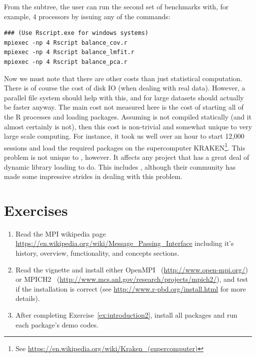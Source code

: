 From the  subtree, the user can run the second set of
benchmarks with, for example, 4 processors by issuing any of the commands:
\begin{lstlisting}
### (Use Rscript.exe for windows systems)
mpiexec -np 4 Rscript balance_cov.r
mpiexec -np 4 Rscript balance_lmfit.r
mpiexec -np 4 Rscript balance_pca.r
\end{lstlisting}

Now we must note that there are other costs than just statistical
computation. There is of course the cost of disk IO (when dealing with real
data). However, a parallel file system should help with this, and for large
datasets should actually be faster anyway. The main cost not measured here
is the cost of starting all of the R processes and loading packages.
Assuming  is not compiled statically (and it almost certainly
is not), then this cost is non-trivial and somewhat unique to very large
scale computing. For instance, it took us well over an hour to start
12,000  sessions and load the required packages on the
supercomputer
KRAKEN\footnote{See \url{https://en.wikipedia.org/wiki/Kraken_(supercomputer)}}.  This problem is not unique to , however.  It affects any project that has a great deal of dynamic library loading to do.  This includes , although their community has made some impressive strides in dealing with this problem.




\section{Exercises}
\label{sec:introduction_exercise}

\begin{enumerate}[label=\thechapter-\arabic*]
\item
Read the MPI wikipedia page \url{https://en.wikipedia.org/wiki/Message_Passing_Interface}
including it's history, overview, functionality, and concepts sections.

\item
Read the  vignette and install either
OpenMPI~ (\url{http://www.open-mpi.org/}) or
MPICH2~
(\url{http://www.mcs.anl.gov/research/projects/mpich2/}),
 and test if the installation is correct (see \url{http://www.r-pbd.org/install.html} for more details).
\label{ex:introduction2}

\item
After completing Exercise~\ref{ex:introduction2},
install all  packages and run each package's demo codes.
\end{enumerate}

